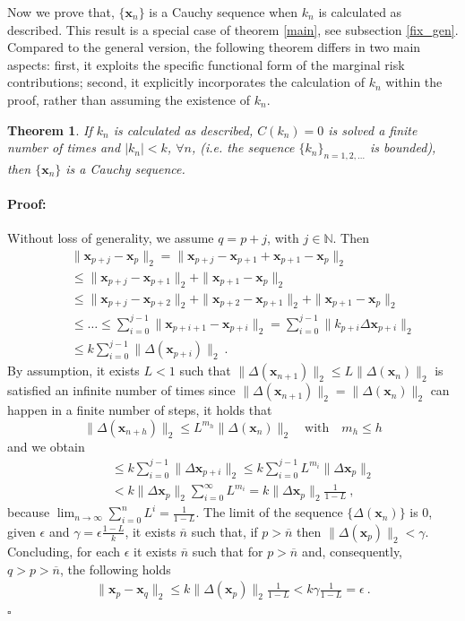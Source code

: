\documentclass[preprint,11pt,authoryear]{elsarticle}
\newtheorem{theorem}{Theorem}%
\newenvironment{proof}{\paragraph{Proof:}}{\hfill$\square$}
\begin{document}
Now we prove that, $\{\mathbf{x}_n\}$ is a Cauchy sequence when $k_n$ is calculated as described. This result is a special case of  theorem \ref{main}, see subsection \ref{fix_gen}. Compared to the general version, the following theorem differs in two main aspects: first, it exploits the specific functional form of the marginal risk contributions; second, it explicitly incorporates the calculation of $k_n$ within the proof, rather than assuming the existence of $k_n$.
\begin{theorem}
If $k_n$ is calculated as described, $C(k_n) = 0$ is solved a finite number of times and $|k_n| < k$, $\forall n$, (i.e. the sequence $\{k_n\}_{n=1,2,\dots} $ is bounded), then $\{\mathbf{x}_n\}$ is a Cauchy sequence.
\end{theorem}
\begin{proof}
Without loss of generality, we assume $q = p + j$, with $j \in \mathbb{N}$. Then
\begin{eqnarray*}
&&\|\mathbf{x}_{p+j} - \mathbf{x}_p \|_2 =\|\mathbf{x}_{p+j}- \mathbf{x}_{p+1}+\mathbf{x}_{p+1} - \mathbf{x}_p \|_2 \\
&&\le \|\mathbf{x}_{p+j}- \mathbf{x}_{p+1}\|_2+ \|\mathbf{x}_{p+1} - \mathbf{x}_p \|_2 \\
&&\le \|\mathbf{x}_{p+j}- \mathbf{x}_{p+2}\|_2+ \|\mathbf{x}_{p+2} - \mathbf{x}_{p+1} \|_2+ \|\mathbf{x}_{p+1} - \mathbf{x}_p \|_2 \\
&&\le  \dots \le  \sum_{i = 0}^{j-1} \|\mathbf{x}_{p+i+1}-\mathbf{x}_{p+i}\|_2 = \sum_{i = 0}^{j-1} \|k_{p+i}\Delta \mathbf{x}_{p+i}\|_2 \\
&& \le k \sum_{i = 0}^{j-1} \|\Delta (\mathbf{x}_{p+i})\|_2 \ . 
\end{eqnarray*}
By assumption, it exists $L < 1 $ such that $\|\Delta (\mathbf{x}_{n+1})\|_2 \le L \|\Delta (\mathbf{x}_n)\|_2$ is satisfied an infinite number of times since $\|\Delta (\mathbf{x}_{n+1})\|_2 = \|\Delta (\mathbf{x}_n)\|_2$ can happen in a finite number of steps, it holds that
 $$\|\Delta (\mathbf{x}_{n+h})\|_2 \le L^{m_h} \|\Delta (\mathbf{x}_n)\|_2 \quad \text{with} \quad m_h \leq h$$
and we obtain
\begin{eqnarray*}
&&\le k \sum_{i = 0}^{j-1} \|\Delta \mathbf{x}_{p+i}\|_2\le k \sum_{i = 0}^{j-1} L^{m_i} \|\Delta \mathbf{x}_p\|_2 \\
&&< k\|\Delta \mathbf{x}_p\|_2 \sum_{i = 0}^{\infty }  L^{m_i}= k\|\Delta \mathbf{x}_p\|_2 \frac 1 {1-L} \ ,
\end{eqnarray*}
because $ \lim_{n \rightarrow \infty}\sum_{i = 0}^n L^i = \frac{1}{1-L}$.
The limit of the sequence $\{\Delta (\mathbf{x}_n)\}$ is $0$, given $\epsilon$ and $\gamma=\epsilon\frac{1-L}k$, it exists $\overline n$ such that, if $p> \overline n$ then $\|\Delta (\mathbf{x}_p)\|_2< \gamma$. 
Concluding, for each $\epsilon$ it exists $\overline n$ such that for $p> \overline n$ and, consequently, $q>p>\overline n$,  the following holds 
\begin{eqnarray*}
\|\mathbf{x}_{p} - \mathbf{x}_q \|_2 \le k\|\Delta (\mathbf{x}_p)\|_2 \frac 1 {1-L} < k \gamma  \frac 1 {1-L} =\epsilon \ .
\end{eqnarray*}
\end{proof}
\end{document}
